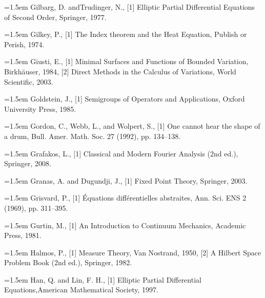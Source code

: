 \noindent\hangindent=1.5em Gilbarg, D. andTrudinger, N., \hypertarget{ref:GilbargTrudinger-1}{[1]} Elliptic Partial Differential Equations of Second Order, Springer, 1977.\par{}
\noindent\hangindent=1.5em Gilkey, P., \hypertarget{ref:Gilkey-1}{[1]} The Index theorem and the Heat Equation, Publish or Perish, 1974.\par{}
\noindent\hangindent=1.5em Giusti, E., \hypertarget{ref:Giusti-1}{[1]} Minimal Surfaces and Functions of Bounded Variation, Birkhäuser, 1984, \hypertarget{ref:Giusti-2}{[2]} Direct Methods in the Calculus of Variations, World Scientific, 2003.\par{}
\noindent\hangindent=1.5em Goldstein, J., \hypertarget{ref:Goldstein-1}{[1]} Semigroups of Operators and Applications, Oxford University Press, 1985.\par{}
\noindent\hangindent=1.5em Gordon, C., Webb, L., and Wolpert, S., \hypertarget{ref:GordonWebbWolpert-1}{[1]} One cannot hear the shape of a drum, Bull. Amer. Math. Soc. 27 (1992), pp. 134--138.\par{}
\noindent\hangindent=1.5em Grafakos, L., \hypertarget{ref:Grafakos-1}{[1]} Classical and Modern Fourier Analysis (2nd ed.), Springer, 2008.\par{}
\noindent\hangindent=1.5em Granas, A. and Dugundji, J., \hypertarget{ref:GranasDugundji-1}{[1]} Fixed Point Theory, Springer, 2003.\par{}
\noindent\hangindent=1.5em Grisvard, P., \hypertarget{ref:Grisvard-1}{[1]} Équations différentielles abstraites, Ann. Sci. ENS 2 (1969), pp. 311--395.\par{}
\noindent\hangindent=1.5em Gurtin, M., \hypertarget{ref:Gurtin-1}{[1]} An Introduction to Continuum Mechanics, Academic Press, 1981.\par{}
\noindent\hangindent=1.5em Halmos, P., \hypertarget{ref:Halmos-1}{[1]} Measure Theory, Van Nostrand, 1950, \hypertarget{ref:Halmos-2}{[2]} A Hilbert Space Problem Book (2nd ed.), Springer, 1982.\par{}
\noindent\hangindent=1.5em Han, Q. and Lin, F. H., \hypertarget{ref:HanLin-1}{[1]} Elliptic Partial Differential Equations,American Mathematical Society, 1997.\par{}
